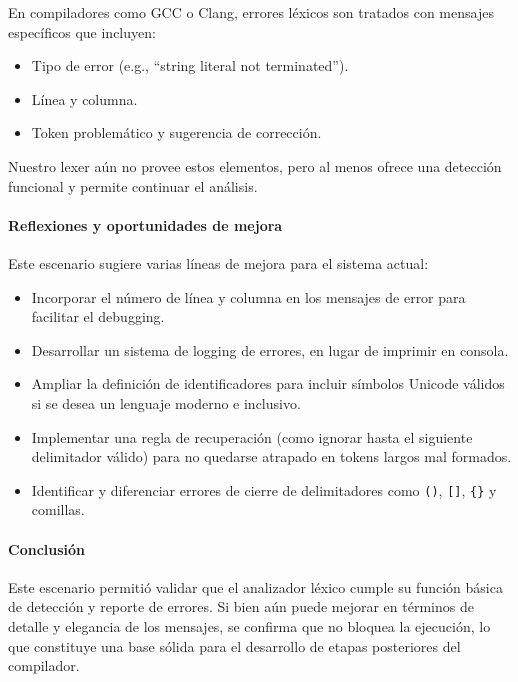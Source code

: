 \documentclass{article}
\begin{document}
En compiladores como GCC o Clang, errores léxicos son tratados con mensajes específicos que incluyen:

\begin{itemize}
  \item Tipo de error (e.g., “string literal not terminated”).
  \item Línea y columna.
  \item Token problemático y sugerencia de corrección.
\end{itemize}

Nuestro lexer aún no provee estos elementos, pero al menos ofrece una detección funcional y permite continuar el análisis.

\paragraph{Reflexiones y oportunidades de mejora}

Este escenario sugiere varias líneas de mejora para el sistema actual:

\begin{itemize}
  \item Incorporar el número de línea y columna en los mensajes de error para facilitar el debugging.
  \item Desarrollar un sistema de logging de errores, en lugar de imprimir en consola.
  \item Ampliar la definición de identificadores para incluir símbolos Unicode válidos si se desea un lenguaje moderno e inclusivo.
  \item Implementar una regla de recuperación (como ignorar hasta el siguiente delimitador válido) para no quedarse atrapado en tokens largos mal formados.
  \item Identificar y diferenciar errores de cierre de delimitadores como \texttt{()}, \texttt{[]}, \texttt{\{\}} y comillas.
\end{itemize}


\paragraph{Conclusión}

Este escenario permitió validar que el analizador léxico cumple su función básica de detección y reporte de errores. Si bien aún puede mejorar en términos de detalle y elegancia de los mensajes, se confirma que no bloquea la ejecución, lo que constituye una base sólida para el desarrollo de etapas posteriores del compilador.
\end{document}
